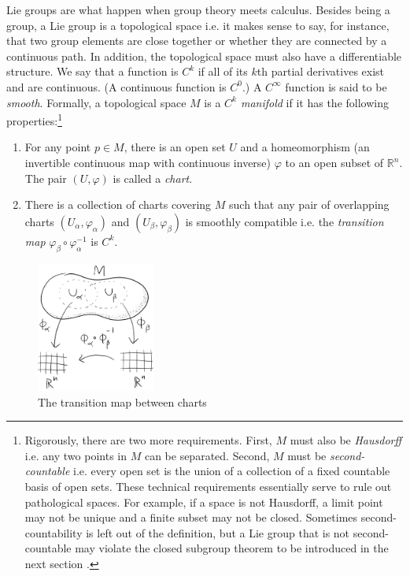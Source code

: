 Lie groups are what happen when group theory meets calculus. Besides being a group, a Lie group is a topological space i.e. it makes sense to say, for instance, that two group elements are close together or whether they are connected by a continuous path. In addition, the topological space must also have a differentiable structure. We say that a function is $C^k$ if all of its $k$th partial derivatives exist and are continuous. (A continuous function is $C^0$.) A $C^{\infty}$ function is said to be \emph{smooth}. Formally, a topological space $M$ is a \emph{$C^k$ manifold} if it has the following properties:\footnote{Rigorously, there are two more requirements. First, $M$ must also be \emph{Hausdorff} i.e. any two points in $M$ can be separated. Second, $M$ must be \emph{second-countable} i.e. every open set is the union of a collection of a fixed countable basis of open sets. These technical requirements essentially serve to rule out pathological spaces. For example, if a space is not Hausdorff, a limit point may not be unique and a finite subset may not be closed. Sometimes second-countability is left out of the definition, but a Lie group that is not second-countable may violate the closed subgroup theorem to be introduced in the next section \cite[pp. 523-525]{Lee}.
}
\begin{enumerate}
	\item For any point $p \in M$, there is an open set $U$ and a homeomorphism (an invertible continuous map with continuous inverse) $\varphi$ to an open subset of $\mathbb{R}^n$. The pair $(U,\varphi)$ is called a \emph{chart}.
	\item There is a collection of charts covering $M$ such that any pair of overlapping charts $(U_{\alpha},\varphi_{\alpha})$ and $(U_{\beta},\varphi_{\beta})$ is smoothly compatible i.e. the \emph{transition map} $\varphi_{\beta} \circ \varphi_{\alpha}^{-1}$ is $C^k$.
\end{enumerate}
\begin{figure}[h]
	\begin{center}
		\includegraphics[width=0.35\textwidth]{img/manifold.png}
		\caption{The transition map between charts}
	\end{center}
\end{figure}
